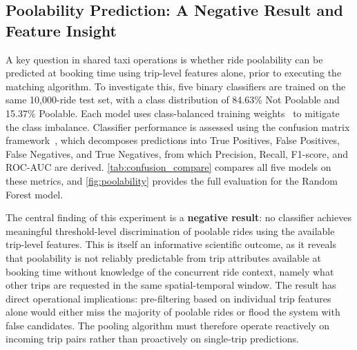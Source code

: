 \documentclass[a4paper,fleqn]{cas-dc}
\begin{document}
\subsection{Poolability Prediction: A Negative Result and Feature Insight}
\label{sec:pool_eval}

A key question in shared taxi operations is whether ride poolability can be predicted at booking time using trip-level features alone, prior to executing the matching algorithm.  To investigate this, five binary classifiers are trained on the same 10{,}000-ride test set, with a class distribution of 84.63\% Not Poolable and 15.37\% Poolable.  Each model uses class-balanced training weights~\cite{scikit-learn} to mitigate the class imbalance.  Classifier performance is assessed using the confusion matrix framework~\cite{powers2011evaluation,scikit-learn}, which decomposes predictions into True Positives, False Positives, False Negatives, and True Negatives, from which Precision, Recall, F1-score, and ROC-AUC are derived.  \autoref{tab:confusion_compare} compares all five models on these metrics, and \autoref{fig:poolability} provides the full evaluation for the Random Forest model.

The central finding of this experiment is a \textbf{negative result}: no classifier achieves meaningful threshold-level discrimination of poolable rides using the available trip-level features.  This is itself an informative scientific outcome, as it reveals that poolability is not reliably predictable from trip attributes available at booking time without knowledge of the concurrent ride context, namely what other trips are requested in the same spatial-temporal window.  The result has direct operational implications: pre-filtering based on individual trip features alone would either miss the majority of poolable rides or flood the system with false candidates.  The pooling algorithm must therefore operate reactively on incoming trip pairs rather than proactively on single-trip predictions.
\end{document}
